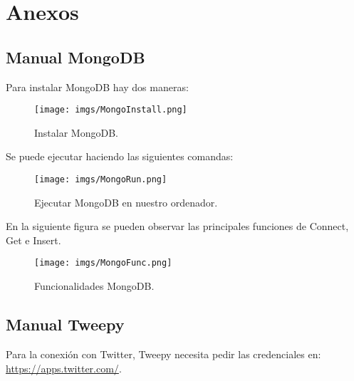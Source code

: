 \documentclass[../all.tex]{subfiles}
\begin{document}
\section{Anexos} 

\subsection{Manual MongoDB}
	Para instalar MongoDB hay dos maneras:\\
	\begin{figure}[H]
		\centering
		\texttt{[image: imgs/MongoInstall.png]}
		\caption{Instalar MongoDB.}
	\end{figure}
	Se puede ejecutar haciendo las siguientes comandas:\\
	\begin{figure}[H]
		\centering
		\texttt{[image: imgs/MongoRun.png]}
		\caption{Ejecutar MongoDB en nuestro ordenador.}
	\end{figure}
\newpage
	En la siguiente figura se pueden observar las principales funciones de Connect, Get e Insert.\\
	\begin{figure}[H]
		\centering
		\texttt{[image: imgs/MongoFunc.png]}
		\caption{Funcionalidades MongoDB.}
	\end{figure}

\newpage
\subsection{Manual Tweepy}
	Para la conexión con Twitter, Tweepy necesita pedir las credenciales en: \newline \url{https://apps.twitter.com/}.\\
	
\end{document}
